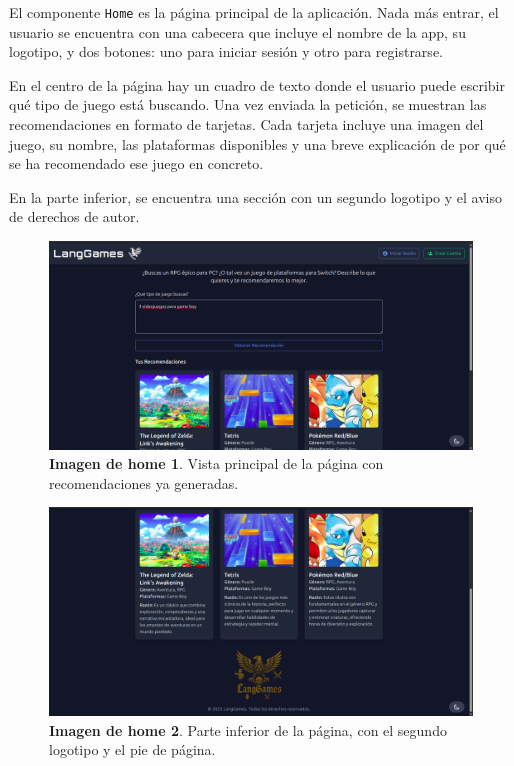 El componente \texttt{Home} es la página principal de la aplicación. Nada más entrar, el usuario se encuentra con una cabecera que incluye el nombre de la app, su logotipo, y dos botones: uno para iniciar sesión y otro para registrarse.

En el centro de la página hay un cuadro de texto donde el usuario puede escribir qué tipo de juego está buscando. Una vez enviada la petición, se muestran las recomendaciones en formato de tarjetas. Cada tarjeta incluye una imagen del juego, su nombre, las plataformas disponibles y una breve explicación de por qué se ha recomendado ese juego en concreto.

En la parte inferior, se encuentra una sección con un segundo logotipo y el aviso de derechos de autor.

\vspace{0.5cm}

\begin{figure}[H]
	\centering
	\includegraphics[width=1\linewidth]{imagenes/home1.png}
	\caption[\textbf{Imagen de home 1}.]{\textbf{Imagen de home 1}. Vista principal de la página con recomendaciones ya generadas.}
	\label{imagen-home-1}
\end{figure}

\begin{figure}[H]
	\centering
	\includegraphics[width=1\linewidth]{imagenes/home2.png}
	\caption[\textbf{Imagen de home 2}.]{\textbf{Imagen de home 2}. Parte inferior de la página, con el segundo logotipo y el pie de página.}
	\label{imagen-home-2}
\end{figure}

